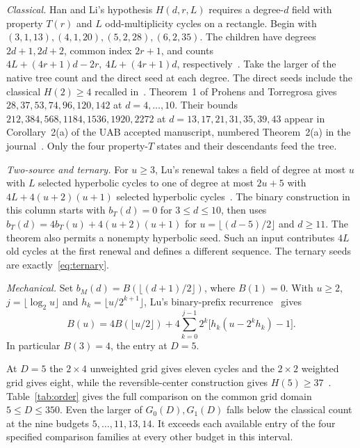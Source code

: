 \smallskip\noindent\emph{Classical.}
Han and Li's hypothesis \(H(d,r,L)\) requires a degree-\(d\) field with property \(T(r)\) and \(L\) odd-multiplicity cycles on a rectangle. Begin with
\((3,1,13),(4,1,20),(5,2,28),(6,2,35)\).
The children have degrees \(2d+1,2d+2\), common index \(2r+1\), and counts \(4L+(4r+1)d-2r,\ 4L+(4r+1)d\), respectively~\cite[Lemma 2.7 and Theorem 2.1]{hanli}. Take the larger of the native tree count and the direct seed at each degree. The direct seeds include the classical \(H(2)\ge4\) recalled in~\cite[\S2]{reversible}. Theorem~1 of Prohens and Torregrosa gives \(28,37,53,74,96,120,142\) at \(d=4,\ldots,10\). Their bounds \(212,384,568,1184,1536,1920,2272\) at \(d=13,17,21,31,35,39,43\) appear in Corollary~2(a) of the UAB accepted manuscript, numbered Theorem~2(a) in the journal~\cite{reversible}. Only the four property-\(T\) states and their descendants feed the tree.

\smallskip\noindent\emph{Two-source and ternary.}
For \(u\ge3\), Lu's renewal takes a field of degree at most \(u\) with \(L\) selected hyperbolic cycles to one of degree at most \(2u+5\) with \(4L+4(u+2)(u+1)\) selected hyperbolic cycles~\cite[Proposition 4.1 and \S4.3]{twosource}. The binary construction in this column starts with \(b_T(d)=0\) for \(3\le d\le10\), then uses \(b_T(d)=4b_T(u)+4(u+2)(u+1)\) for \(u=\lfloor(d-5)/2\rfloor\) and \(d\ge11\). The theorem also permits a nonempty hyperbolic seed. Such an input contributes \(4L\) old cycles at the first renewal and defines a different sequence. The ternary seeds are exactly~\eqref{eq:ternary}.

\smallskip\noindent\emph{Mechanical.}
Set \(b_M(d)=B(\lfloor(d+1)/2\rfloor)\), where \(B(1)=0\). With \(u\ge2\), \(j=\lfloor\log_2u\rfloor\) and \(h_k=\lfloor u/2^{k+1}\rfloor\), Lu's binary-prefix recurrence~\cite[Proposition 3.3]{mechanical} gives
\[
 B(u)=4B(\lfloor u/2\rfloor)
     +4\sum_{k=0}^{j-1}2^k\bigl[h_k(u-2^kh_k)-1\bigr].
\]
In particular \(B(3)=4\), the entry at \(D=5\).

At \(D=5\) the \(2\times4\) unweighted grid gives eleven cycles and the \(2\times2\) weighted grid gives eight, while the reversible-center construction gives \(H(5)\ge37\)~\cite[Theorem 1]{reversible}. Table~\ref{tab:order} gives the full comparison on the common grid domain \(5\le D\le350\). Even the larger of \(G_0(D),G_1(D)\) falls below the classical count at the nine budgets \(5,\ldots,11,13,14\). It exceeds each available entry of the four specified comparison families at every other budget in this interval.

